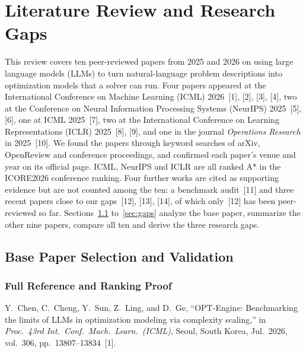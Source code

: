 \documentclass[11pt,a4paper]{article}
\begin{document}
\begingroup
{}
\setlength{\parskip}{0pt}
\setcounter{tocdepth}{2}
\tableofcontents
\endgroup
\vspace{10pt}

\section{Literature Review and Research Gaps}
\label{sec:lit}

This review covers ten peer-reviewed papers from 2025 and 2026 on using large language models (LLMs) to turn natural-language problem descriptions into optimization models that a solver can run. Four papers appeared at the International Conference on Machine Learning (ICML) 2026~[1], [2], [3], [4], two at the Conference on Neural Information Processing Systems (NeurIPS) 2025~[5], [6], one at ICML 2025~[7], two at the International Conference on Learning Representations (ICLR) 2025~[8], [9], and one in the journal \textit{Operations Research} in 2025~[10]. We found the papers through keyword searches of arXiv, OpenReview and conference proceedings, and confirmed each paper's venue and year on its official page. ICML, NeurIPS and ICLR are all ranked A* in the ICORE2026 conference ranking. Four further works are cited as supporting evidence but are not counted among the ten: a benchmark audit~[11] and three recent papers close to our gaps~[12], [13], [14], of which only~[12] has been peer-reviewed so far. Sections~\ref{sec:base} to~\ref{sec:gaps} analyze the base paper, summarize the other nine papers, compare all ten and derive the three research gaps.

\subsection{Base Paper Selection and Validation}
\label{sec:base}

\subsubsection{Full Reference and Ranking Proof}

Y.~Chen, C.~Cheng, Y.~Sun, Z.~Ling, and D.~Ge, ``OPT-Engine: Benchmarking the limits of LLMs in optimization modeling via complexity scaling,'' in \textit{Proc.\ 43rd Int.\ Conf.\ Mach.\ Learn.\ (ICML)}, Seoul, South Korea, Jul.\ 2026, vol.~306, pp.~13807--13834~[1].
\end{document}
